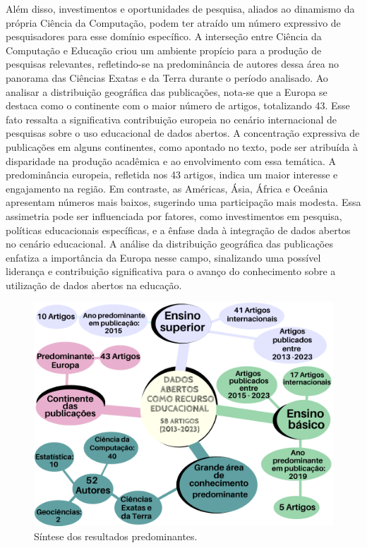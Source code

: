 \documentclass[portuguese]{textolivre}
\begin{document}
Além disso, investimentos e oportunidades de pesquisa, aliados ao dinamismo da própria Ciência da Computação, podem ter atraído um número expressivo de pesquisadores para esse domínio específico. A interseção entre Ciência da Computação e Educação criou um ambiente propício para a produção de pesquisas relevantes, refletindo-se na predominância de autores dessa área no panorama das Ciências Exatas e da Terra durante o período analisado.
Ao analisar a distribuição geográfica das publicações, nota-se que a Europa se destaca como o continente com o maior número de artigos, totalizando 43. Esse fato ressalta a significativa contribuição europeia no cenário internacional de pesquisas sobre o uso educacional de dados abertos.
A concentração expressiva de publicações em alguns continentes, como apontado no texto, pode ser atribuída à disparidade na produção acadêmica e ao envolvimento com essa temática. A predominância europeia, refletida nos 43 artigos, indica um maior interesse e engajamento na região. Em contraste, as Américas, Ásia, África e Oceânia apresentam números mais baixos, sugerindo uma participação mais modesta. Essa assimetria pode ser influenciada por fatores, como investimentos em pesquisa, políticas educacionais específicas, e a ênfase dada à integração de dados abertos no cenário educacional. A análise da distribuição geográfica das publicações enfatiza a importância da Europa nesse campo, sinalizando uma possível liderança e contribuição significativa para o avanço do conhecimento sobre a utilização de dados abertos na educação. 

\begin{figure}[h!]
\centering
\begin{minipage}{0.75\linewidth}
\includegraphics[width=\linewidth]{Fig7.png}
\caption{Síntese dos resultados predominantes.}
\label{fig7}
\end{minipage}
\end{figure}
\end{document}
